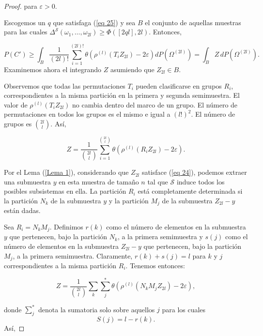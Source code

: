 \documentclass{report}
\begin{document}
\begin{proof}
para \( \varepsilon > 0 \).\newline

Escogemos un \( q \) que satisfaga (\ref{eq 25}) y sea \( B \) el conjunto de aquellas muestras para las cuales 
\( \Delta^{\mathcal{S}}(\omega_1, \dots, \omega_{2l}) \geq \Phi([ 2ql ], 2l) \). Entonces,

\begin{equation*}
P(C') \geq \int_B \frac{1}{(2l)!} \sum_{i=1}^{(2l)!} \theta \left( \rho^{(l)} (T_i Z_{2l}) - 2\varepsilon \right) dP(\Omega^{(2l)})
= \int_B Z \, dP(\Omega^{(2l)}).
\end{equation*}
Examinemos ahora el integrando \( Z \) asumiendo que \( Z_{2l} \in B \).\newline

Observemos que todas las permutaciones \( T_i \) pueden clasificarse en grupos \( R_i \),
correspondientes a la misma partición en la primera y segunda semimuestra.
El valor de \( \rho^{(l)} (T_i Z_{2l}) \) no cambia dentro del marco de un grupo.
El número de permutaciones en todos los grupos es el mismo e igual a \( (l!)^2 \).
El número de grupos es \( \binom{2l}{l} \). Así, 

\[
Z = \frac{1}{\binom{2l}{l}} \sum_{i=1}^{\binom{2l}{l}} \theta ( \rho^{(l)} (R_i Z_{2l}) - 2\varepsilon ).
\]

Por el Lema (\ref{Lema 1}), considerando que \( Z_{2l} \) satisface (\ref{eq 24}), podemos extraer una submuestra \( y \)
en esta muestra de tamaño \( n \) tal que \( \mathcal{S} \) induce todos los posibles subsistemas en ella.
La partición \( R_i \) está completamente determinada si la partición \( N_k \) de la submuestra \( y \)
y la partición \( M_j \) de la submuestra \( Z_{2l} - y \) están dadas.\newline

Sea \( R_i = N_k M_j \). Definimos \( r(k) \) como el número de elementos en la submuestra \( y \) que pertenecen,
bajo la partición \( N_k \), a la primera semimuestra y \( s(j) \) como el número de elementos en la submuestra
\( Z_{2l} - y \) que pertenecen, bajo la partición \( M_j \), a la primera semimuestra.
Claramente, \( r(k) + s(j) = l \) para \( k \) y \( j \) correspondientes a la misma partición \( R_i \).
Tenemos entonces:

\[
Z = \frac{1}{\binom{2l}{l}} \sum_k \sum_j^* \theta ( \rho^{(l)} (N_k M_j Z_{2l}) - 2\varepsilon ),
\]

donde \( \displaystyle\sum_j^* \) denota la sumatoria solo sobre aquellos \( j \) para los cuales 
\[
S(j) = l - r(k).
\]
Así,


\end{proof}
\end{document}
